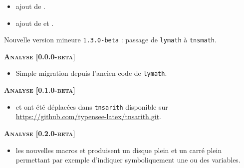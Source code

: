 \documentclass[12pt,a4paper]{book}
\begin{document}
\begin{description}
\begin{itemize}[itemsep=.5em]

    

    \item {}
          ajout de .


    

    \item {}
          ajout de  et .


    

\end{itemize}


\separation

\end{description}\begin{description}
\medskip
\item[2020-07-21] Nouvelle version mineure \verb+1.3.0-beta+ : passage de \verb#lymath# à \verb#tnsmath#.




\begin{center}
    \textbf{\textsc{Analyse [0.0.0-beta]}}
\end{center}

\begin{itemize}[itemsep=.5em]
    \item Simple migration depuis l'ancien code de \verb+lymath+.
\end{itemize}


\begin{center}
    \textbf{\textsc{Analyse [0.1.0-beta]}}
\end{center}

\begin{itemize}[itemsep=.5em]
    \item {}  et  ont été déplacées dans \texttt{tnsarith} disponible sur \url{https://github.com/typensee-latex/tnsarith.git}.
\end{itemize}


\begin{center}
    \textbf{\textsc{Analyse [0.2.0-beta]}}
\end{center}

\begin{itemize}[itemsep=.5em]
    \item {} les nouvelles macros  et  produisent un disque plein et un carré plein permettant par exemple d'indiquer symboliquement une ou des variables.
    

\end{itemize}
\end{description}
\end{document}
